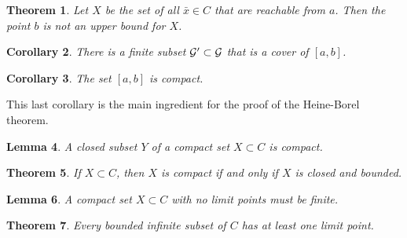 \documentclass{amsart}
\newtheorem{theorem}{Theorem}
\newtheorem{lemma}[theorem]{Lemma}
\newtheorem{corollary}[theorem]{Corollary}
\newcommand{\1}{\mathds{1}}
\numberwithin{equation}{section}
\numberwithin{theorem}{section}
\begin{document}
\begin{theorem}
Let $X$ be the set of all $\bar x\in C$ that are \emph{reachable from $a$}.  Then the point $b$ is not an upper bound for $X$.
%
\end{theorem}

\begin{corollary}
There is a finite subset $\mathcal G'\subset\mathcal G$ that is a cover of $[a,b]$.
\end{corollary}

\begin{corollary}
The set $[a, b]$ is compact.
\end{corollary}

This last corollary is the main ingredient for the proof of the Heine-Borel theorem.

\begin{lemma}
A closed subset $Y$ of a compact set $X \subset C$ is compact.
\end{lemma}

\begin{theorem} If $X \subset C$, then  $X$ is compact if and only if $X$ is closed and bounded.
\end{theorem}


\begin{lemma}
A compact set $X \subset C$ with no limit points must be finite.
\end{lemma}

\begin{theorem} Every bounded infinite subset of $C$ has at least one limit point.
\end{theorem}
\end{document}
